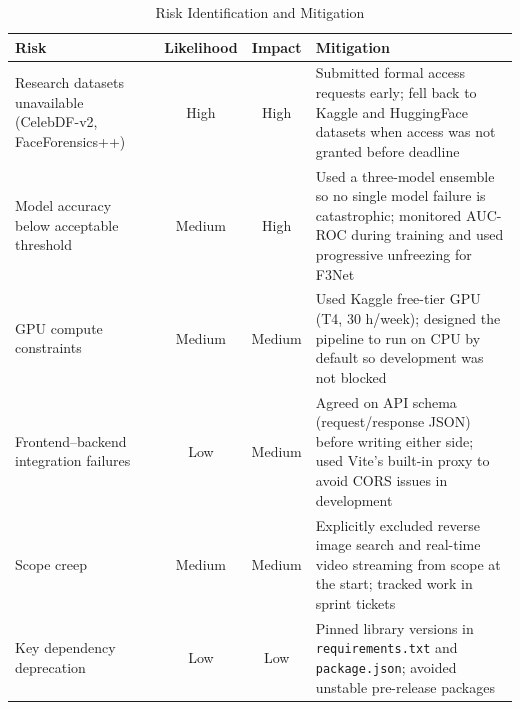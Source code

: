 \renewcommand{\arraystretch}{1.35}
\begin{table}[H]
\centering
\begin{tabular}{|p{3.4cm}|c|c|p{6.2cm}|}
\hline
\textbf{Risk} & \textbf{Likelihood} & \textbf{Impact} & \textbf{Mitigation} \\
\hline
Research datasets unavailable (CelebDF-v2, FaceForensics++) & High & High &
  Submitted formal access requests early; fell back to Kaggle and HuggingFace datasets when access was not granted before deadline \\
\hline
Model accuracy below acceptable threshold & Medium & High &
  Used a three-model ensemble so no single model failure is catastrophic; monitored AUC-ROC during training and used progressive unfreezing for F3Net \\
\hline
GPU compute constraints & Medium & Medium &
  Used Kaggle free-tier GPU (T4, 30 h/week); designed the pipeline to run on CPU by default so development was not blocked \\
\hline
Frontend--backend integration failures & Low & Medium &
  Agreed on API schema (request/response JSON) before writing either side; used Vite's built-in proxy to avoid CORS issues in development \\
\hline
Scope creep & Medium & Medium &
  Explicitly excluded reverse image search and real-time video streaming from scope at the start; tracked work in sprint tickets \\
\hline
Key dependency deprecation & Low & Low &
  Pinned library versions in \texttt{requirements.txt} and \texttt{package.json}; avoided unstable pre-release packages \\
\hline
\end{tabular}
\caption{Risk Identification and Mitigation}
\label{tab:risks}
\end{table}
